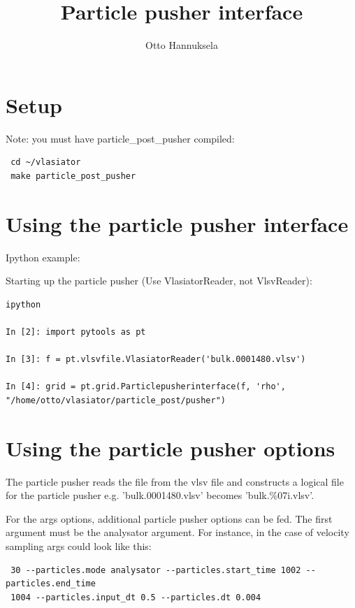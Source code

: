 \documentclass[a4paper,10pt]{article}
\title{Particle pusher interface}
\author{Otto Hannuksela}
\begin{document}
\maketitle

\tableofcontents

\newpage

\section{Setup}

Note: you must have particle\_post\_pusher compiled:

\begin{verbatim}
 cd ~/vlasiator
 make particle_post_pusher
\end{verbatim}


\section{Using the particle pusher interface}

Ipython example:

Starting up the particle pusher (Use VlasiatorReader, not VlsvReader):

\begin{verbatim}
ipython

In [2]: import pytools as pt

In [3]: f = pt.vlsvfile.VlasiatorReader('bulk.0001480.vlsv')

In [4]: grid = pt.grid.Particlepusherinterface(f, 'rho', "/home/otto/vlasiator/particle_post/pusher")
\end{verbatim}

\section{Using the particle pusher options}

The particle pusher reads the file from the vlsv file and constructs a logical file for the particle pusher e.g. 'bulk.0001480.vlsv' becomes 'bulk.\%07i.vlsv'.

For the args options, additional particle pusher options can be fed. The first argument must be the analysator argument. For instance, in the case of velocity sampling args could 
look like this:

\begin{verbatim}
 30 --particles.mode analysator --particles.start_time 1002 --particles.end_time 
 1004 --particles.input_dt 0.5 --particles.dt 0.004
\end{verbatim}
\end{document}
